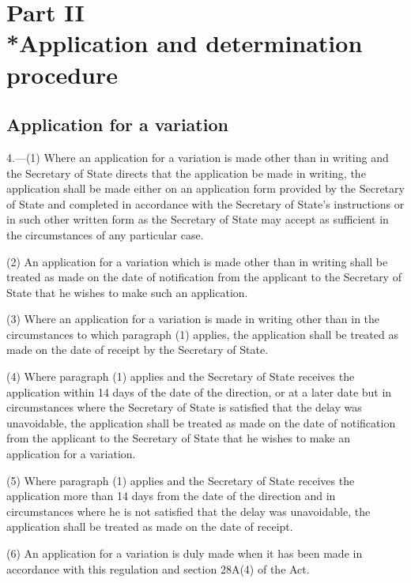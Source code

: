 \documentclass[12pt,a4paper]{article}
\begin{document}
\section[Part II --- Application and determination procedure]{Part II\\*Application and determination procedure}

\renewcommand\parthead{--- Part II}

\subsection[4. Application for a variation]{Application for a variation}

4.---(1)  Where an application for a variation is made other than in writing and the Secretary of State directs that the application be made in writing, the application shall be made either on an application form provided by the Secretary of State and completed in accordance with the Secretary of State’s instructions or in such other written form as the Secretary of State may accept as sufficient in the circumstances of any particular case.

(2) An application for a variation which is made other than in writing shall be treated as made on the date of notification from the applicant to the Secretary of State that he wishes to make such an application.

(3) Where an application for a variation is made in writing other than in the circumstances to which paragraph (1) applies, the application shall be treated as made on the date of receipt by the Secretary of State.

(4) Where paragraph (1) applies and the Secretary of State receives the application within 14 days of the date of the direction, or at a later date but in circumstances where the Secretary of State is satisfied that the delay was unavoidable, the application shall be treated as made on the date of notification from the applicant to the Secretary of State that he wishes to make an application for a variation.

(5) Where paragraph (1) applies and the Secretary of State receives the application more than 14 days from the date of the direction and in circumstances where he is not satisfied that the delay was unavoidable, the application shall be treated as made on the date of receipt.

(6) An application for a variation is duly made when it has been made in accordance with this regulation and section 28A(4) of the Act.
\end{document}
